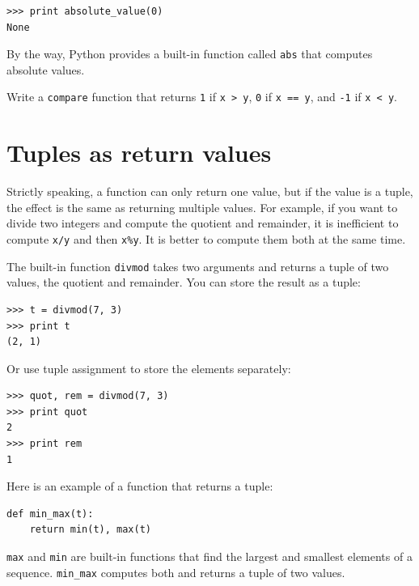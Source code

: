 \documentclass[10pt]{book}
\begin{document}

\beforeverb
\begin{verbatim}
>>> print absolute_value(0)
None
\end{verbatim}
\afterverb
%
By the way, Python provides a built-in function called 
{\tt abs} that computes absolute values.


\begin{ex}


Write a {\tt compare} function
that returns {\tt 1} if {\tt x > y},
{\tt 0} if {\tt x == y}, and {\tt -1} if {\tt x < y}.
\end{ex}

\section{Tuples as return values}


Strictly speaking, a function can only return one value, but
if the value is a tuple, the effect is the same as returning
multiple values.  For example, if you want to divide two integers
and compute the quotient and remainder, it is inefficient to
compute {\tt x/y} and then {\tt x\%y}.  It is better to compute
them both at the same time.


The built-in function {\tt divmod} takes two arguments and
returns a tuple of two values, the quotient and remainder.
You can store the result as a tuple:

\beforeverb
\begin{verbatim}
>>> t = divmod(7, 3)
>>> print t
(2, 1)
\end{verbatim}
\afterverb
%
Or use tuple assignment to store the elements separately:


\beforeverb
\begin{verbatim}
>>> quot, rem = divmod(7, 3)
>>> print quot
2
>>> print rem
1
\end{verbatim}
\afterverb
%
Here is an example of a function that returns a tuple:

\beforeverb
\begin{verbatim}
def min_max(t):
    return min(t), max(t)
\end{verbatim}
\afterverb
%
{\tt max} and {\tt min} are built-in functions that find
the largest and smallest elements of a sequence.  \verb"min_max"
computes both and returns a tuple of two values.
\end{document}
